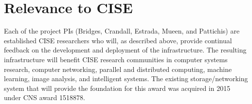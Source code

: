 \documentclass[11pt]{article}
\begin{document}
\section{Relevance to CISE}

Each of the project PIs (Bridges, Crandall, Estrada, Mueen, and Pattichis) are established
CISE researchers who will, as described above, provide continual feedback on the development
and deployment of the infrastructure. The resulting infrastructure will benefit CISE research
communities in computer systems research, computer networking, parallel and distributed computing, 
machine learning, image analysis, and intelligent systems. The existing storage/networking system that 
will provide the foundation for this award was acquired in 2015 under CNS award 1518878.
 
\newpage
\setcounter{page}{1}


\end{document}
